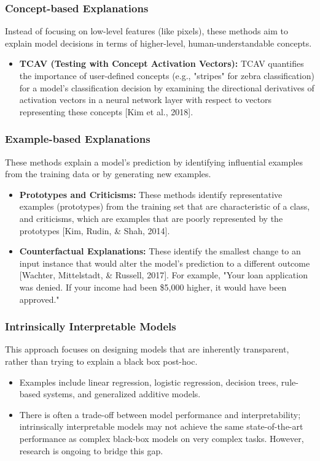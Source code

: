 \documentclass[11pt,a4paper]{article}
\begin{document}
\subsubsection{Concept-based Explanations}
Instead of focusing on low-level features (like pixels), these methods aim to explain model decisions in terms of higher-level, human-understandable concepts.
\begin{itemize}
    \item \textbf{TCAV (Testing with Concept Activation Vectors):} TCAV quantifies the importance of user-defined concepts (e.g., "stripes" for zebra classification) for a model's classification decision by examining the directional derivatives of activation vectors in a neural network layer with respect to vectors representing these concepts [Kim et al., 2018].
\end{itemize}

\subsubsection{Example-based Explanations}
These methods explain a model's prediction by identifying influential examples from the training data or by generating new examples.
\begin{itemize}
    \item \textbf{Prototypes and Criticisms:} These methods identify representative examples (prototypes) from the training set that are characteristic of a class, and criticisms, which are examples that are poorly represented by the prototypes [Kim, Rudin, \& Shah, 2014].
    \item \textbf{Counterfactual Explanations:} These identify the smallest change to an input instance that would alter the model's prediction to a different outcome [Wachter, Mittelstadt, \& Russell, 2017]. For example, "Your loan application was denied. If your income had been \$5,000 higher, it would have been approved."
\end{itemize}

\subsubsection{Intrinsically Interpretable Models}
This approach focuses on designing models that are inherently transparent, rather than trying to explain a black box post-hoc.
\begin{itemize}
    \item Examples include linear regression, logistic regression, decision trees, rule-based systems, and generalized additive models.
    \item There is often a trade-off between model performance and interpretability; intrinsically interpretable models may not achieve the same state-of-the-art performance as complex black-box models on very complex tasks. However, research is ongoing to bridge this gap.
\end{itemize}
\end{document}

